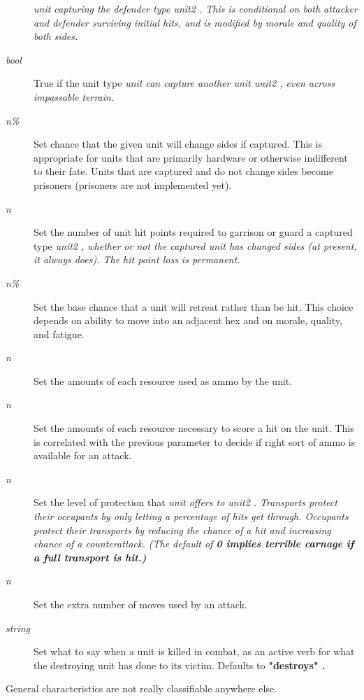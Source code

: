 \begin{description}
\it unit \rm%
capturing the defender
type %
\it unit2\rm%
.  This is conditional
on both attacker and defender surviving initial hits, and is modified
by morale and quality of both sides.
\item[{%
\it bool}]
True if the unit type %
\it unit \rm%
can capture another unit
%
\it unit2\rm%
, even across impassable terrain.
\item[{%
\it n\%}]
Set chance that the given unit will change sides if captured.
This is appropriate for units that are primarily hardware or
otherwise indifferent to their fate.  Units that are captured and
do not change sides become prisoners (prisoners are not implemented yet).
\item[{%
\it n}]
Set the number of unit hit points required to garrison or guard a captured
type %
\it unit2\rm%
, whether or not the captured unit has changed sides
(at present, it always does).
The hit point loss is permanent.
\item[{%
\it n\%}]
Set the base chance that a unit will retreat rather than be hit.
This choice depends on ability to move into an adjacent hex and on
morale, quality, and fatigue.
\item[{%
\it n}]
Set the amounts of each resource used as ammo by the unit.
\item[{%
\it n}]
Set the amounts of each resource necessary to score a hit on the unit.
This is correlated with the previous parameter to decide if right sort
of ammo is available for an attack.
\item[{%
\it n}]
Set the level of protection that %
\it unit \rm%
offers to %
\it unit2\rm%
.
Transports protect their occupants by only letting a percentage of
hits get through.  Occupants protect their transports by reducing the
chance of a hit and increasing chance of a counterattack.
(The default of %
\bf 0 \rm%
implies terrible carnage if a full transport is hit.)
\item[{%
\it n}]
Set the extra number of moves used by an attack.
\item[{%
\it string}]
Set what to say when a unit is killed in combat,
as an active verb for what the destroying unit has done to its victim.
Defaults to %
\bf "destroys"\rm%
.
\end{description}\par\noindent
General characteristics are not really classifiable anywhere else.
